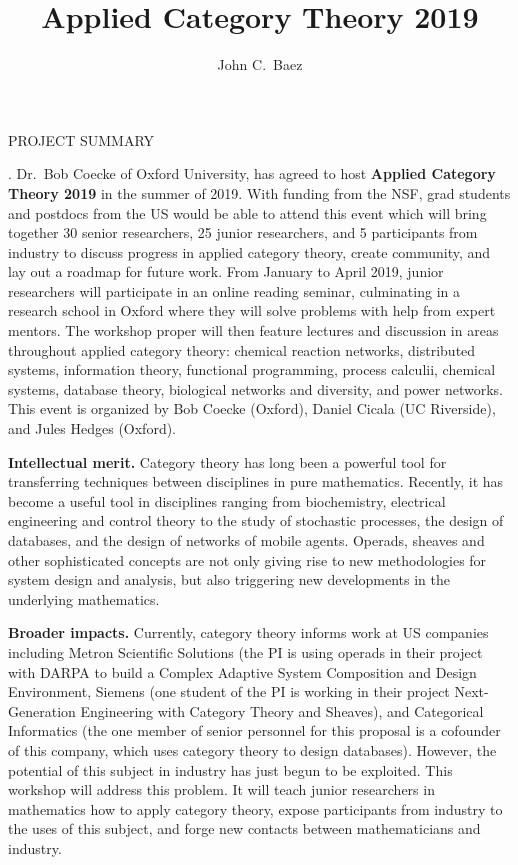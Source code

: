\documentclass[12pt]{amsart}
\begin{document}
\centerline{\large PROJECT SUMMARY}
\title{Applied Category Theory 2019}
\author{John C.\ Baez}

\maketitle

.  Dr.\ Bob Coecke of Oxford University, has
agreed to host \textbf{Applied Category Theory 2019} in the summer of
2019. With funding from the NSF, grad students and postdocs from the US
would be able to attend this event which will bring together 30
senior researchers, 25 junior researchers, and 5 participants from
industry to discuss progress in applied category theory, create
community, and lay out a roadmap for future work.  From January to
April 2019, junior researchers will participate in an online reading
seminar, culminating in a research school in Oxford where they will
solve problems with help from expert mentors.  The workshop proper
will then feature lectures and discussion in areas throughout applied
category theory: chemical reaction networks, distributed systems,
information theory, functional programming, process calculii, chemical
systems, database theory, biological networks and diversity, and power
networks.  This event is organized by Bob Coecke (Oxford), Daniel
Cicala (UC Riverside), and Jules Hedges (Oxford).

\noindent \textbf{Intellectual merit.}  Category theory has long been a powerful tool for transferring techniques between disciplines in pure mathematics.  Recently, it has become a useful tool in disciplines ranging from biochemistry, electrical engineering and control theory to the study of stochastic processes, the design of databases, and the design of networks of mobile agents.   Operads, sheaves and other sophisticated concepts are not only giving rise to new methodologies for system design and analysis, but also triggering new developments in the underlying mathematics.

\noindent \textbf{Broader impacts.} 
Currently, category theory informs work at US companies including Metron Scientific Solutions (the PI is using operads in their project with DARPA to build a Complex Adaptive System Composition and Design Environment, Siemens (one student of the PI is working in their project Next-Generation Engineering with Category Theory and Sheaves), and Categorical Informatics (the one member of senior personnel for this proposal is a cofounder of this company, which uses category theory to design databases).   However, the potential of this subject in industry has just begun to be exploited.  This workshop will address this problem.  It will teach junior researchers in mathematics how to apply category theory, expose participants from industry to the uses of this subject, and forge new contacts between mathematicians and industry.  
\end{document}

